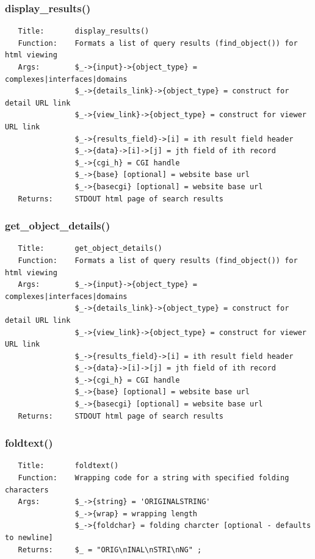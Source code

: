 \documentclass{article}
\begin{document}
\subsubsection*{display\_results()\label{pibase::web_pilig_display_results_}}
\begin{verbatim}
   Title:       display_results()
   Function:    Formats a list of query results (find_object()) for html viewing
   Args:        $_->{input}->{object_type} = complexes|interfaces|domains
                $_->{details_link}->{object_type} = construct for detail URL link
                $_->{view_link}->{object_type} = construct for viewer URL link
                $_->{results_field}->[i] = ith result field header
                $_->{data}->[i]->[j] = jth field of ith record
                $_->{cgi_h} = CGI handle
                $_->{base} [optional] = website base url
                $_->{basecgi} [optional] = website base url
   Returns:     STDOUT html page of search results
\end{verbatim}
\subsubsection*{get\_object\_details()\label{pibase::web_pilig_get_object_details_}}
\begin{verbatim}
   Title:       get_object_details()
   Function:    Formats a list of query results (find_object()) for html viewing
   Args:        $_->{input}->{object_type} = complexes|interfaces|domains
                $_->{details_link}->{object_type} = construct for detail URL link
                $_->{view_link}->{object_type} = construct for viewer URL link
                $_->{results_field}->[i] = ith result field header
                $_->{data}->[i]->[j] = jth field of ith record
                $_->{cgi_h} = CGI handle
                $_->{base} [optional] = website base url
                $_->{basecgi} [optional] = website base url
   Returns:     STDOUT html page of search results
\end{verbatim}
\subsubsection*{foldtext()\label{pibase::web_pilig_foldtext_}}
\begin{verbatim}
   Title:       foldtext()
   Function:    Wrapping code for a string with specified folding characters
   Args:        $_->{string} = 'ORIGINALSTRING'
                $_->{wrap} = wrapping length
                $_->{foldchar} = folding charcter [optional - defaults to newline]
   Returns:     $_ = "ORIG\nINAL\nSTRI\nNG" ;
\end{verbatim}
\end{document}
